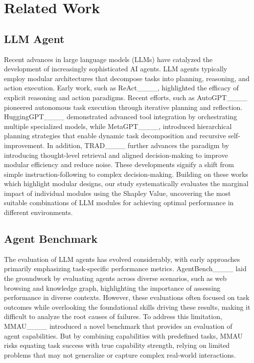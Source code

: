 \section{Related Work}
\subsection{LLM Agent}
Recent advances in large language models (LLMs) have catalyzed the development of increasingly sophisticated AI agents. LLM agents typically employ modular architectures that decompose tasks into planning, reasoning, and action execution. Early work, such as ReAct____, highlighted the efficacy of explicit reasoning and action paradigms. Recent efforts, such as AutoGPT____ pioneered autonomous task execution through iterative planning and reflection. HuggingGPT____ demonstrated advanced tool integration by orchestrating multiple specialized models, while MetaGPT____, introduced hierarchical planning strategies that enable dynamic task decomposition and recursive self-improvement.
In addition, TRAD____ further advances the paradigm by introducing thought-level retrieval and aligned decision-making to improve modular efficiency and reduce noise.
These developments signify a shift from simple instruction-following to complex decision-making. 
Building on these works which highlight modular designs, our study systematically evaluates the marginal impact of individual modules using the Shapley Value, uncovering the most suitable combinations of LLM modules for achieving optimal performance in different environments.

\subsection{Agent Benchmark}
The evaluation of LLM agents has evolved considerably, with early approaches primarily emphasizing task-specific performance metrics. AgentBench____ laid the groundwork by evaluating agents across diverse scenarios, such as web browsing and knowledge graph, highlighting the importance of assessing performance in diverse contexts. However, these evaluations often focused on task outcomes while overlooking the foundational skills driving these results, making it difficult to analyze the root causes of failures. To address this limitation, MMAU____ introduced a novel benchmark that provides an evaluation of agent capabilities.  But by combining capabilities with predefined tasks, MMAU risks equating task success with true capability strength, relying on limited problems that may not generalize or capture complex real-world interactions.

